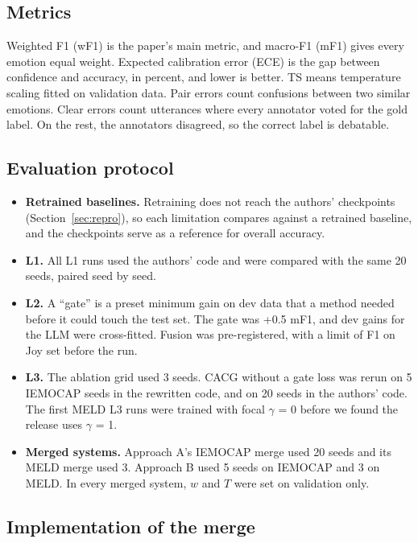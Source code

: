 \documentclass[11pt,a4paper]{article}
\newcommand{\mn}{\textminus}
\begin{document}
\subsection{Metrics}

Weighted F1 (wF1) is the paper's main metric, and macro-F1 (mF1) gives every emotion equal weight. Expected calibration error (ECE) is the gap between confidence and accuracy, in percent, and lower is better. TS means temperature scaling fitted on validation data. Pair errors count confusions between two similar emotions. Clear errors count utterances where every annotator voted for the gold label. On the rest, the annotators disagreed, so the correct label is debatable.

\subsection{Evaluation protocol}

\begin{itemize}
  \item \textbf{Retrained baselines.} Retraining does not reach the authors' checkpoints (Section~\ref{sec:repro}), so each limitation compares against a retrained baseline, and the checkpoints serve as a reference for overall accuracy.
  \item \textbf{L1.} All L1 runs used the authors' code and were compared with the same 20 seeds, paired seed by seed.
  \item \textbf{L2.} A ``gate'' is a preset minimum gain on dev data that a method needed before it could touch the test set. The gate was +0.5 mF1, and dev gains for the LLM were cross-fitted. Fusion was pre-registered, with a limit of \mn2.0 F1 on Joy set before the run.
  \item \textbf{L3.} The ablation grid used 3 seeds. CACG without a gate loss was rerun on 5 IEMOCAP seeds in the rewritten code, and on 20 seeds in the authors' code. The first MELD L3 runs were trained with focal $\gamma$ = 0 before we found the release uses $\gamma$ = 1.
  \item \textbf{Merged systems.} Approach A's IEMOCAP merge used 20 seeds and its MELD merge used 3. Approach B used 5 seeds on IEMOCAP and 3 on MELD. In every merged system, $w$ and $T$ were set on validation only.
\end{itemize}

\subsection{Implementation of the merge}
\end{document}
